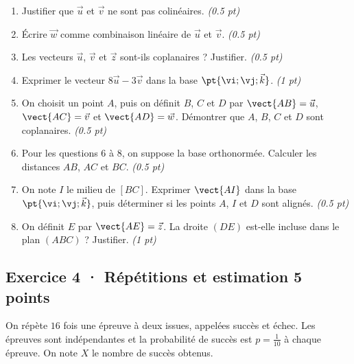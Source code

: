 \begin{enumerate}

\item Justifier que $\vec u$ et $\vec v$ ne sont pas colinéaires. \hfill\textit{(\num{0,5} pt)}

\item Écrire $\vec w$ comme combinaison linéaire de $\vec u$ et $\vec v$. \hfill\textit{(\num{0,5} pt)}

\item Les vecteurs $\vec u$, $\vec v$ et $\vec z$ sont-ils coplanaires ? Justifier. \hfill\textit{(\num{0,5} pt)}

\item Exprimer le vecteur $8\vec u-3\vec v$ dans la base $\pt{\vi;\vj;\vec k}$. \hfill\textit{(1 pt)}

\item On choisit un point $A$, puis on définit $B$, $C$ et $D$ par $\vect{AB}=\vec u$, $\vect{AC}=\vec v$ et $\vect{AD}=\vec w$. Démontrer que $A$, $B$, $C$ et $D$ sont coplanaires. \hfill\textit{(\num{0,5} pt)}

\item Pour les questions 6 à 8, on suppose la base orthonormée. Calculer les distances $AB$, $AC$ et $BC$. \hfill\textit{(\num{0,5} pt)}

\item On note $I$ le milieu de $[BC]$. Exprimer $\vect{AI}$ dans la base $\pt{\vi;\vj;\vec k}$, puis déterminer si les points $A$, $I$ et $D$ sont alignés. \hfill\textit{(\num{0,5} pt)}

\item On définit $E$ par $\vect{AE}=\vec z$. La droite $(DE)$ est-elle incluse dans le plan $(ABC)$ ? Justifier. \hfill\textit{(1 pt)}

\end{enumerate}

\subsection*{Exercice 4 · Répétitions et estimation \hfill 5 points}On répète $16$ fois une épreuve à deux issues, appelées succès et échec. Les épreuves sont indépendantes et la probabilité de succès est $p=\frac{1}{10}$ à chaque épreuve. On note $X$ le nombre de succès obtenus.

